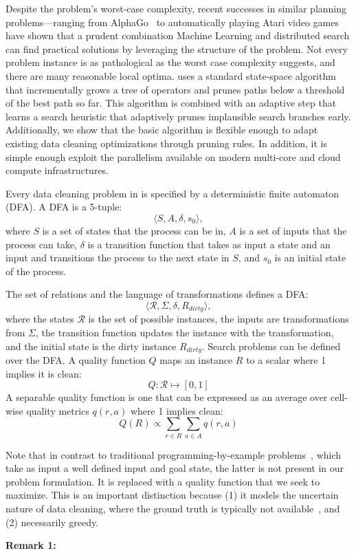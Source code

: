 Despite the problem's worst-case complexity, 
recent successes in similar planning problems---ranging from AlphaGo~\cite{silver2016mastering} to automatically playing Atari video games~\cite{mnih2015human} have shown that a prudent combination Machine Learning and distributed search can find practical solutions by leveraging the structure of the problem.  
Not every problem instance is as pathological as the worst case complexity suggests, and there are many reasonable local optima. 
\sys uses a standard state-space algorithm that incrementally grows a tree of operators and prunes paths below a threshold of the best path so far. 
This algorithm is combined with an adaptive step that learns a search heuristic that adaptively prunes implausible search branches early.
Additionally, we show that the basic algorithm is flexible enough to adapt existing data cleaning optimizations through pruning rules.  In addition, it is simple enough exploit the parallelism available on modern multi-core and cloud compute infrastructures.


    Every data cleaning problem in \sys is specified by a deterministic finite automaton (DFA). 
    A DFA is a 5-tuple:
    \[\langle S, A, \delta, s_0\rangle,\]
    where $S$ is a set of states that the process can be in, $A$ is a set of inputs that the process can take, $\delta$ is a transition function that takes as input a state and an input and transitions the process to the next state in $S$, and $s_0$ is an initial state of the process.

    The set of relations and the language of transformations defines a DFA:
    \[\langle \mathcal{R}, \Sigma, \delta, R_{dirty}\rangle, \]
    where the states $\mathcal{R}$ is the set of possible instances, the inputs are transformations from $\Sigma$, the transition function updates the instance with the transformation, and the initial state is the dirty instance $R_{dirty}$. Search problems can be defined over the DFA. 
    A quality function $Q$ maps an instance $R$ to a scalar where 1 implies it is clean:
    \[
    Q: \mathcal{R} \mapsto [0,1]
    \]
    A separable quality function is one that can be expressed as an average over cell-wise quality metrics $q(r,a)$ where 1 implies clean:
    \[
    Q(R) \propto \sum_{r \in R} \sum_{a \in A} q(r,a)
    \]

    Note that in contrast to traditional programming-by-example problems~\cite{}, which take as input a well defined input and goal state, the latter is not present in our problem formulation.  It is replaced with a quality function that we seek to maximize.  This is an important distinction because (1) it models the uncertain nature of data cleaning, where the ground truth is typically not available~\cite{}, and (2) necessarily greedy.

    \vspace{0.5em} \noindent \textbf{Remark 1: } 



\fi







